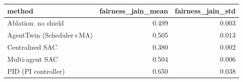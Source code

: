 \begin{tabular}{lrr}
\toprule
method & fairness_jain_mean & fairness_jain_std \\
\midrule
Ablation: no shield & 0.499 & 0.003 \\
AgentTwin (Scheduler+MA) & 0.505 & 0.013 \\
Centralized SAC & 0.380 & 0.002 \\
Multi-agent SAC & 0.504 & 0.006 \\
PID (PI controller) & 0.650 & 0.038 \\
\bottomrule
\end{tabular}
